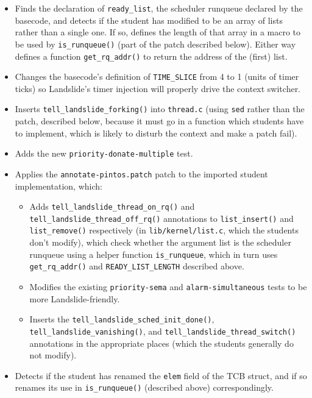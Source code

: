 \begin{itemize}
	\item Finds the declaration of {\tt ready\_list}, the scheduler runqueue declared by the basecode,
		and detects if the student has modified to be an array of lists rather than a single one.
		If so, defines the length of that array in a macro to be used by {\tt is\_runqueue()}
		(part of the patch described below).
		Either way defines a function {\tt get\_rq\_addr()} to return the address of the (first) list.
	\item Changes the basecode's definition of {\tt TIME\_SLICE} from 4 to 1 (units of timer ticks)
		so Landslide's timer injection will properly drive the context switcher.
	\item Inserts {\tt tell\_landslide\_forking()} into {\tt thread.c}
		(using {\tt sed} rather than the patch, described below,
		because it must go in a function which students have to implement,
		which is likely to disturb the context and make a patch fail).
	\item Adds the new {\tt priority-donate-multiple} test.
	\item Applies the {\tt annotate-pintos.patch} patch to the imported student implementation, which:
	\begin{itemize}
		\item Adds {\tt tell\_landslide\_thread\_on\_rq()}
			and {\tt tell\_landslide\_thread\_off\_rq()}
			annotations
			to {\tt list\_insert()} and {\tt list\_remove()} respectively
			(in {\tt lib/kernel/\allowbreak{}list.c}, which the students don't modify),
			which
			check whether the argument list
			is the scheduler runqueue
			using a helper function {\tt is\_runqueue},
			which in turn uses {\tt get\_rq\_addr()} and {\tt READY\_LIST\_LENGTH} described above.
		\item Modifies the existing {\tt priority-sema} and {\tt alarm-simultaneous} tests to be more Landslide-friendly.
		\item Inserts the {\tt tell\_landslide\_sched\_init\_done()},
			{\tt tell\_landslide\_vanishing()},
			and {\tt tell\_landslide\_thread\_switch()}
			annotations in the appropriate places
			(which the students generally do not modify).
	\end{itemize}
	\item Detects if the student has renamed the {\tt elem} field of the TCB struct,
		and if so renames its use in {\tt is\_runqueue()} (described above) correspondingly.
\end{itemize}

